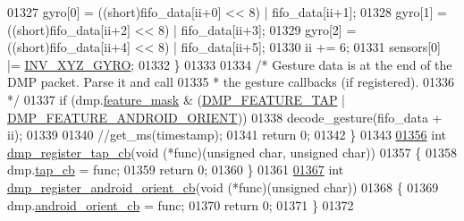 \begin{DoxyCode}
01327         gyro[0] = ((short)fifo\_data[ii+0] << 8) | fifo\_data[ii+1];
01328         gyro[1] = ((short)fifo\_data[ii+2] << 8) | fifo\_data[ii+3];
01329         gyro[2] = ((short)fifo\_data[ii+4] << 8) | fifo\_data[ii+5];
01330         ii += 6;
01331         sensors[0] |= \hyperlink{group___d_r_i_v_e_r_s_ga3fdc30f9c0a26c2c4e2bb88921f91629}{INV\_XYZ\_GYRO};
01332     \}
01333 
01334     \textcolor{comment}{/* Gesture data is at the end of the DMP packet. Parse it and call}
01335 \textcolor{comment}{     * the gesture callbacks (if registered).}
01336 \textcolor{comment}{     */}
01337     \textcolor{keywordflow}{if} (dmp.\hyperlink{structdmp__s_ac1c048fa56b613b3223d2e66ac2c050f}{feature\_mask} & (\hyperlink{group___d_r_i_v_e_r_s_ga87fac39cf95e2c56afdf507a986fa00b}{DMP\_FEATURE\_TAP} | 
      \hyperlink{group___d_r_i_v_e_r_s_gaf2b250fc928390d562f7bd80300ce419}{DMP\_FEATURE\_ANDROID\_ORIENT}))
01338         decode\_gesture(fifo\_data + ii);
01339 
01340     \textcolor{comment}{//get\_ms(timestamp);}
01341     \textcolor{keywordflow}{return} 0;
01342 \}
01343 
\hypertarget{inv__mpu__dmp__motion__driver_8c_source.tex_l01356}{}\hyperlink{group___d_r_i_v_e_r_s_ga8a2df36126e34b78863e3acf1249d814}{01356} \textcolor{keywordtype}{int} \hyperlink{group___d_r_i_v_e_r_s_ga8a2df36126e34b78863e3acf1249d814}{dmp\_register\_tap\_cb}(\textcolor{keywordtype}{void} (*func)(\textcolor{keywordtype}{unsigned} \textcolor{keywordtype}{char}, \textcolor{keywordtype}{unsigned} \textcolor{keywordtype}{char}))
01357 \{
01358     dmp.\hyperlink{structdmp__s_a45a59366dd83331a3ae376edeb5b9e94}{tap\_cb} = func;
01359     \textcolor{keywordflow}{return} 0;
01360 \}
01361 
\hypertarget{inv__mpu__dmp__motion__driver_8c_source.tex_l01367}{}\hyperlink{group___d_r_i_v_e_r_s_ga2e66a02d29ec89466cf339587592943c}{01367} \textcolor{keywordtype}{int} \hyperlink{group___d_r_i_v_e_r_s_ga2e66a02d29ec89466cf339587592943c}{dmp\_register\_android\_orient\_cb}(\textcolor{keywordtype}{void} (*func)(\textcolor{keywordtype}{unsigned} \textcolor{keywordtype}{char}))
01368 \{
01369     dmp.\hyperlink{structdmp__s_a4ae9e6ba505d73d0db861f6ca28c1a3a}{android\_orient\_cb} = func;
01370     \textcolor{keywordflow}{return} 0;
01371 \}
01372 
\end{DoxyCode}
